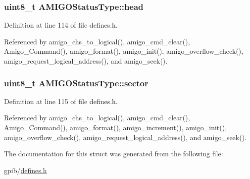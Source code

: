 \subsubsection[{\texorpdfstring{head}{head}}]{\setlength{\rightskip}{0pt plus 5cm}uint8\+\_\+t A\+M\+I\+G\+O\+Status\+Type\+::head}\hypertarget{structAMIGOStatusType_af10e6015013496cad58cfc7a8aec6b1f}{}\label{structAMIGOStatusType_af10e6015013496cad58cfc7a8aec6b1f}


Definition at line 114 of file defines.\+h.



Referenced by amigo\+\_\+chs\+\_\+to\+\_\+logical(), amigo\+\_\+cmd\+\_\+clear(), Amigo\+\_\+\+Command(), amigo\+\_\+format(), amigo\+\_\+init(), amigo\+\_\+overflow\+\_\+check(), amigo\+\_\+request\+\_\+logical\+\_\+address(), and amigo\+\_\+seek().

\subsubsection[{\texorpdfstring{sector}{sector}}]{\setlength{\rightskip}{0pt plus 5cm}uint8\+\_\+t A\+M\+I\+G\+O\+Status\+Type\+::sector}\hypertarget{structAMIGOStatusType_ada8db219718dd44d4251d10cbd523117}{}\label{structAMIGOStatusType_ada8db219718dd44d4251d10cbd523117}


Definition at line 115 of file defines.\+h.



Referenced by amigo\+\_\+chs\+\_\+to\+\_\+logical(), amigo\+\_\+cmd\+\_\+clear(), Amigo\+\_\+\+Command(), amigo\+\_\+format(), amigo\+\_\+increment(), amigo\+\_\+init(), amigo\+\_\+overflow\+\_\+check(), amigo\+\_\+request\+\_\+logical\+\_\+address(), and amigo\+\_\+seek().



The documentation for this struct was generated from the following file\+:\begin{DoxyCompactItemize}
\item 
gpib/\hyperlink{defines_8h}{defines.\+h}\end{DoxyCompactItemize}
